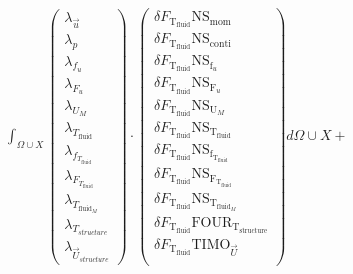 \documentclass[10pt]{article} %
\begin{document}
\begin{center}
		$\int_{\Omega \cup X}
	\begin{pmatrix}
		\lambda_{\vec{u}} \\ \lambda_p \\ \lambda_{f_u} \\ \lambda_{F_u} \\ \lambda_{U_M}\\ \lambda_{T_{\text{fluid}}} \\ \lambda_{f_{T_{\text{fluid}}}} \\ \lambda_{F_{T_{\text{fluid}}}} \\ \lambda_{T_{\text{fluid}_M}} \\ \lambda_{T_{structure}} \\ \lambda_{\vec{U}_{structure}}
	\end{pmatrix}
	\cdot
	\begin{pmatrix}
		\delta F_{\text{T}_{\text{fluid}}} \text{NS}_{\text{mom}} \\
		\delta F_{\text{T}_{\text{fluid}}} \text{NS}_{\text{conti}}\\
		\delta F_{\text{T}_{\text{fluid}}} \text{NS}_{\text{f}_u} \\
		\delta F_{\text{T}_{\text{fluid}}} \text{NS}_{\text{F}_u} \\
		\delta F_{\text{T}_{\text{fluid}}} \text{NS}_{\text{U}_M} \\
		\delta F_{\text{T}_{\text{fluid}}} \text{NS}_{\text{T}_{\text{fluid}}} \\
		\delta F_{\text{T}_{\text{fluid}}} \text{NS}_{\text{f}_{\text{T}_{\text{fluid}}}}\\
		\delta F_{\text{T}_{\text{fluid}}} \text{NS}_{\text{F}_{\text{T}_{\text{fluid}}}}\\
		\delta F_{\text{T}_{\text{fluid}}} \text{NS}_{\text{T}_{\text{fluid}_M}}\\
		\delta F_{\text{T}_{\text{fluid}}} \text{FOUR}_{\text{T}_{\text{structure}}}\\
		\delta F_{\text{T}_{\text{fluid}}} \text{TIMO}_{\vec{U}}\\
	\end{pmatrix}
	d\Omega \cup X + $\\


\end{center}
\end{document}
